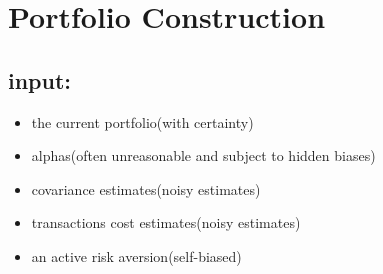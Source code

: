 \documentclass[presentation]{beamer}
\begin{document}
\section{Portfolio Construction}
\label{sec:orgheadline16}

\subsection{input:}
\label{sec:orgheadline7}
\begin{itemize}
\item the current portfolio(with certainty)
\item alphas(often unreasonable and subject to hidden biases)
\item covariance estimates(noisy estimates)
\item transactions cost estimates(noisy estimates)
\item an active risk aversion(self-biased)
\end{itemize}
\end{document}
